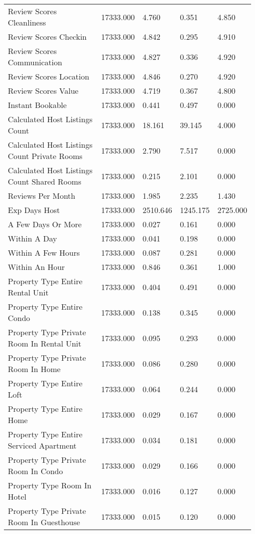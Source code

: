 \begin{tabular}{lllll}
Review Scores Cleanliness & 17333.000 & 4.760 & 0.351 & 4.850 \\
Review Scores Checkin & 17333.000 & 4.842 & 0.295 & 4.910 \\
Review Scores Communication & 17333.000 & 4.827 & 0.336 & 4.920 \\
Review Scores Location & 17333.000 & 4.846 & 0.270 & 4.920 \\
Review Scores Value & 17333.000 & 4.719 & 0.367 & 4.800 \\
Instant Bookable & 17333.000 & 0.441 & 0.497 & 0.000 \\
Calculated Host Listings Count & 17333.000 & 18.161 & 39.145 & 4.000 \\
Calculated Host Listings Count Private Rooms & 17333.000 & 2.790 & 7.517 & 0.000 \\
Calculated Host Listings Count Shared Rooms & 17333.000 & 0.215 & 2.101 & 0.000 \\
Reviews Per Month & 17333.000 & 1.985 & 2.235 & 1.430 \\
Exp Days Host & 17333.000 & 2510.646 & 1245.175 & 2725.000 \\
A Few Days Or More & 17333.000 & 0.027 & 0.161 & 0.000 \\
Within A Day & 17333.000 & 0.041 & 0.198 & 0.000 \\
Within A Few Hours & 17333.000 & 0.087 & 0.281 & 0.000 \\
Within An Hour & 17333.000 & 0.846 & 0.361 & 1.000 \\
Property Type Entire Rental Unit & 17333.000 & 0.404 & 0.491 & 0.000 \\
Property Type Entire Condo & 17333.000 & 0.138 & 0.345 & 0.000 \\
Property Type Private Room In Rental Unit & 17333.000 & 0.095 & 0.293 & 0.000 \\
Property Type Private Room In Home & 17333.000 & 0.086 & 0.280 & 0.000 \\
Property Type Entire Loft & 17333.000 & 0.064 & 0.244 & 0.000 \\
Property Type Entire Home & 17333.000 & 0.029 & 0.167 & 0.000 \\
Property Type Entire Serviced Apartment & 17333.000 & 0.034 & 0.181 & 0.000 \\
Property Type Private Room In Condo & 17333.000 & 0.029 & 0.166 & 0.000 \\
Property Type Room In Hotel & 17333.000 & 0.016 & 0.127 & 0.000 \\
Property Type Private Room In Guesthouse & 17333.000 & 0.015 & 0.120 & 0.000 \\

\end{tabular}
